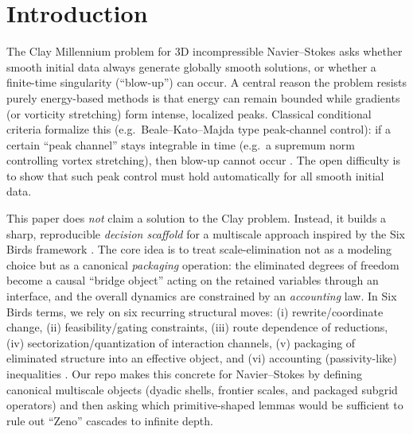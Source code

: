 \documentclass[11pt]{article}
\begin{document}
\section{Introduction}

The Clay Millennium problem for 3D incompressible Navier--Stokes asks whether smooth initial data always generate globally smooth solutions, or whether a finite-time singularity (``blow-up'') can occur. A central reason the problem resists purely energy-based methods is that energy can remain bounded while gradients (or vorticity stretching) form intense, localized peaks. Classical conditional criteria formalize this (e.g.\ Beale--Kato--Majda type peak-channel control): if a certain ``peak channel'' stays integrable in time (e.g.\ a supremum norm controlling vortex stretching), then blow-up cannot occur \citep{bkm_1984}. The open difficulty is to show that such peak control must hold automatically for all smooth initial data.

This paper does \emph{not} claim a solution to the Clay problem. Instead, it builds a sharp, reproducible \emph{decision scaffold} for a multiscale approach inspired by the Six Birds framework \citep{tsiokos_2026_18365949}. The core idea is to treat scale-elimination not as a modeling choice but as a canonical \emph{packaging} operation: the eliminated degrees of freedom become a causal ``bridge object'' acting on the retained variables through an interface, and the overall dynamics are constrained by an \emph{accounting} law. In Six Birds terms, we rely on six recurring structural moves:
(i) rewrite/coordinate change, (ii) feasibility/gating constraints, (iii) route dependence of reductions, (iv) sectorization/quantization of interaction channels, (v) packaging of eliminated structure into an effective object, and (vi) accounting (passivity-like) inequalities \citep{tsiokos_2026_18365949}. Our repo makes this concrete for Navier--Stokes by defining canonical multiscale objects (dyadic shells, frontier scales, and packaged subgrid operators) and then asking which primitive-shaped lemmas would be sufficient to rule out ``Zeno'' cascades to infinite depth.
\end{document}
